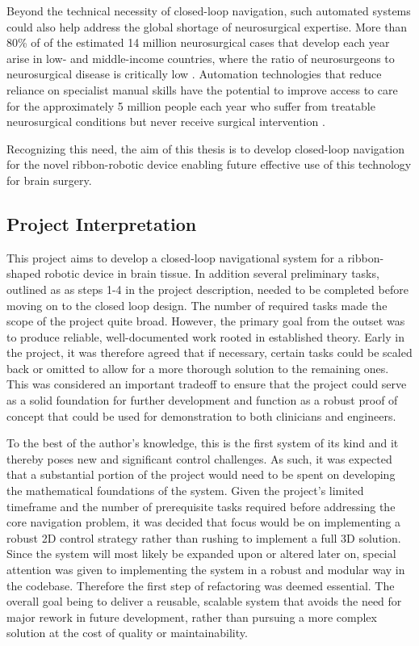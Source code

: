 Beyond the technical necessity of closed-loop navigation, such automated systems could also help address the global shortage of neurosurgical expertise. More than 80\% of of the estimated 14 million neurosurgical cases that develop each year arise in low- and middle-income countries, where the ratio of neurosurgeons to neurosurgical disease is critically low \cite{dewan_global_2019}. Automation technologies that reduce reliance on specialist manual skills have the potential to improve access to care for the approximately 5 million people each year who suffer from treatable neurosurgical conditions but never receive surgical intervention \cite{dewan_global_2019}.

Recognizing this need, the aim of this thesis is to develop closed-loop navigation for the novel ribbon-robotic device enabling future effective use of this technology for brain surgery. 


\subsection{Project Interpretation}

This project aims to develop a closed-loop navigational system for a ribbon-shaped robotic device in brain tissue. In addition several preliminary tasks, outlined as  as steps 1-4 in the project description, needed to be completed before moving on to the closed loop design. The number of required tasks made the scope of the project quite broad. However, the primary goal from the outset was to produce reliable, well-documented work rooted in established theory. Early in the project, it was therefore agreed that if necessary, certain tasks could be scaled back or omitted to allow for a more thorough solution to the remaining ones. This was considered an important tradeoff to ensure that the project could serve as a solid foundation for further development and function as a robust proof of concept that could be used for demonstration to both clinicians and engineers.

To the best of the author's knowledge, this is the first system of its kind and it thereby poses new and significant control challenges. As such, it was expected that a substantial portion of the project would need to be spent on developing the mathematical foundations of the system. Given the project's limited timeframe and the number of prerequisite tasks required before addressing the core navigation problem, it was decided that focus would be on implementing a robust 2D control strategy rather than rushing to implement a full 3D solution. Since the system will most likely be expanded upon or altered later on, special attention was  given to implementing the system in a robust and modular way in the codebase. Therefore the first step of refactoring was deemed essential. The overall goal being to deliver a reusable, scalable system that avoids the need for major rework in future development, rather than pursuing a more complex solution at the cost of quality or maintainability. 


